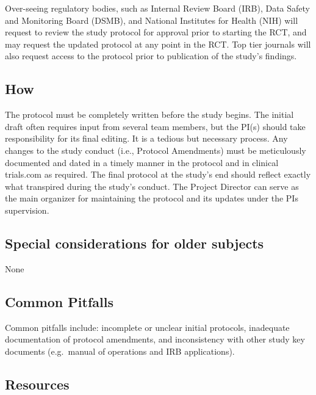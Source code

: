 \documentclass[]{book}
\begin{document}
Over-seeing regulatory bodies, such as Internal Review Board (IRB), Data
Safety and Monitoring Board (DSMB), and National Institutes for Health
(NIH) will request to review the study protocol for approval prior to
starting the RCT, and may request the updated protocol at any point in
the RCT. Top tier journals will also request access to the protocol
prior to publication of the study's findings.

\subsection{How}\label{how-11}

The protocol must be completely written before the study begins. The
initial draft often requires input from several team members, but the
PI(s) should take responsibility for its final editing. It is a tedious
but necessary process. Any changes to the study conduct (i.e., Protocol
Amendments) must be meticulously documented and dated in a timely manner
in the protocol and in clinical trials.com as required. The final
protocol at the study's end should reflect exactly what transpired
during the study's conduct. The Project Director can serve as the main
organizer for maintaining the protocol and its updates under the PIs
supervision.

\subsection{Special considerations for older
subjects}\label{special-considerations-for-older-subjects-7}

None

\subsection{Common Pitfalls}\label{common-pitfalls-10}

Common pitfalls include: incomplete or unclear initial protocols,
inadequate documentation of protocol amendments, and inconsistency with
other study key documents (e.g.~manual of operations and IRB
applications).

\subsection{Resources}\label{resources-12}
\end{document}
